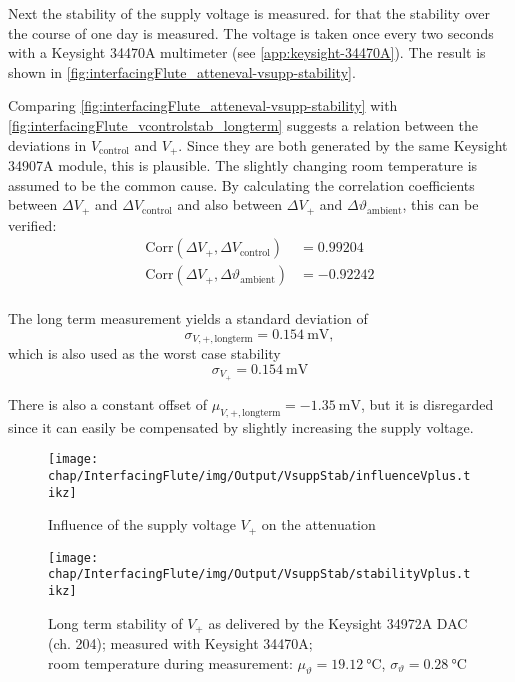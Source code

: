 Next the stability of the supply voltage is measured.
for that the stability over the course of one day is measured. The voltage is taken once every two seconds with a Keysight 34470A multimeter (see \autoref{app:keysight-34470A}). The result is shown in \autoref{fig:interfacingFlute_atteneval-vsupp-stability}.


Comparing \autoref{fig:interfacingFlute_atteneval-vsupp-stability} with \autoref{fig:interfacingFlute_vcontrolstab_longterm} suggests a relation between the deviations in $V_\text{control}$ and $V_+$. Since they are both generated by the same Keysight 34907A module, this is plausible. The slightly changing room temperature is assumed to be the common cause.
By calculating the correlation coefficients between $\Delta V_+$ and $\Delta V_\text{control}$ and also between $\Delta V_+$ and $\Delta \vartheta_\text{ambient}$, this can be verified:
\begin{align}
\text{Corr}(\Delta V_+,\Delta V_\text{control})         &= \num{0.99204} \\
\text{Corr}(\Delta V_+,\Delta \vartheta_\text{ambient}) &= \num{-0.92242} \\
\end{align}

The long term measurement yields a standard deviation of
\begin{equation}
\sigma_{V,+,\text{longterm}} = \SI{0.154}{\milli\volt},
\end{equation}
which is also used as the worst case stability
\begin{equation}
\sigma_{V_+} = \SI{0.154}{\milli\volt}
\end{equation}

There is also a constant offset of $\mu_{V,+,\text{longterm}}=\SI{-1.35}{\milli\volt}$, but it is disregarded since it can easily be compensated by slightly increasing the supply voltage.

\begin{figure}[H]
	\centering
	\texttt{[image: chap/InterfacingFlute/img/Output/VsuppStab/influenceVplus.tikz]}
	\caption{Influence of the supply voltage $V_+$ on the attenuation}
	\label{fig:interfacingFlute_atteneval-vsupp-influence}
\end{figure}

\begin{figure}[H]
	\centering
	\texttt{[image: chap/InterfacingFlute/img/Output/VsuppStab/stabilityVplus.tikz]}
	\caption[Long term stability of the supply voltage]{Long term stability of $V_{+}$ as delivered by the Keysight 34972A DAC (ch. 204); measured with Keysight 34470A;\\room temperature during measurement: $\mu_\vartheta=\SI{19.12}{\degreeCelsius}$, $\sigma_\vartheta=\SI{0.28}{\degreeCelsius}$}
	\label{fig:interfacingFlute_atteneval-vsupp-stability}
\end{figure}

